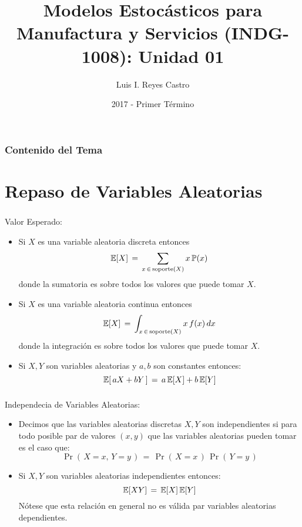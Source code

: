 \documentclass[ 10pt, xcolor = dvipsnames]{beamer}
\title[Modelos Estoc\'asticos: Unidad 01]{Modelos Estoc\'asticos para Manufactura y Servicios (INDG-1008): \textbf{Unidad 01} }
\author[L. I. Reyes Castro]{Luis I. Reyes Castro}
\institute[ESPOL]{\normalsize Escuela Superior Polit\'ecnica del Litoral (ESPOL) \\ Guayaquil - Ecuador}
\date[2017-T1]{2017 - Primer T\'ermino}
\begin{document}
\begin{frame}[noframenumbering]
\titlepage
\end{frame}
\begin{frame}[noframenumbering]
\frametitle{Contenido del Tema}
\tableofcontents[ subsectionstyle = hide]
\end{frame}

\section{Repaso de Variables Aleatorias}

\begin{frame}[allowframebreaks]
\frametitle{\insertsection}

Valor Esperado: 
\begin{itemize}
\item Si $X$ es una variable aleatoria discreta entonces 
\[
\mathbb{E}[X] \, = \, \sum_{ x \, \in \, \text{soporte}(X) } x \, \mathbb{P}(x)
\]
donde la sumatoria es sobre todos los valores que puede tomar $X$. 
\item Si $X$ es una variable aleatoria continua entonces 
\[
\mathbb{E}[X] \, = \, \int_{ x \, \in \, \text{soporte}(X) } x \, f(x) \, dx
\]
donde la integraci\'on es sobre todos los valores que puede tomar $X$. 
\item Si $X,Y$ son variables aleatorias y $a,b$ son constantes entonces: 
\[
\mathbb{E}[ \, a X + b Y \, ] \, = \, a \, \mathbb{E}[X] + b \, \mathbb{E}[Y]
\]
\end{itemize}

\end{frame}

\begin{frame}[allowframebreaks]
\frametitle{\insertsection}

Independecia de Variables Aleatorias: 
\begin{itemize}
\item Decimos que las variables aleatorias discretas $X,Y$ son independientes si \linebreak para todo posible par de valores $(x,y)$ que las variables aleatorias \linebreak pueden tomar es el caso que: 
\[
\Pr( \, X = x, \, Y = y \, ) \, = \,
\Pr( \, X = x \, ) \, \Pr( \, Y = y \, )
\]
\item Si $X,Y$ son variables aleatorias independientes entonces: 
\[
\mathbb{E}[XY] \, = \, \mathbb{E}[X] \, \mathbb{E}[Y]
\]
N\'otese que esta relaci\'on en general no es v\'alida par variables aleatorias dependientes. 
\end{itemize}

\end{frame}
\end{document}
